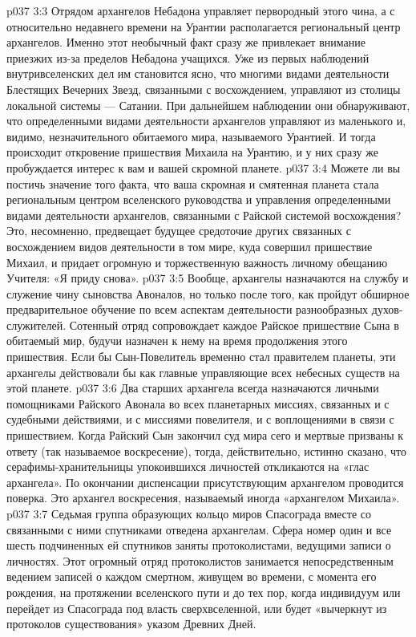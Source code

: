 \vs p037 3:3 \pc Отрядом архангелов Небадона управляет первородный этого чина, а с относительно недавнего времени на Урантии располагается региональный центр архангелов. Именно этот необычный факт сразу же привлекает внимание приезжих из\hyp{}за пределов Небадона учащихся. Уже из первых наблюдений внутривселенских дел им становится ясно, что многими видами деятельности Блестящих Вечерних Звезд, связанными с восхождением, управляют из столицы локальной системы --- Сатании. При дальнейшем наблюдении они обнаруживают, что определенными видами деятельности архангелов управляют из маленького и, видимо, незначительного обитаемого мира, называемого Урантией. И тогда происходит откровение пришествия Михаила на Урантию, и у них сразу же пробуждается интерес к вам и вашей скромной планете.
\vs p037 3:4 Можете ли вы постичь значение того факта, что ваша скромная и смятенная планета стала региональным центром вселенского руководства и управления определенными видами деятельности архангелов, связанными с Райской системой восхождения? Это, несомненно, предвещает будущее средоточие других связанных с восхождением видов деятельности в том мире, куда совершил пришествие Михаил, и придает огромную и торжественную важность личному обещанию Учителя: «Я приду снова».
\vs p037 3:5 \pc Вообще, архангелы назначаются на службу и служение чину сыновства Авоналов, но только после того, как пройдут обширное предварительное обучение по всем аспектам деятельности разнообразных духов\hyp{}служителей. Сотенный отряд сопровождает каждое Райское пришествие Сына в обитаемый мир, будучи назначен к нему на время продолжения этого пришествия. Если бы Сын\hyp{}Повелитель временно стал правителем планеты, эти архангелы действовали бы как главные управляющие всех небесных существ на этой планете.
\vs p037 3:6 Два старших архангела всегда назначаются личными помощниками Райского Авонала во всех планетарных миссиях, связанных и с судебными действиями, и с миссиями повелителя, и с воплощениями в связи с пришествием. Когда Райский Сын закончил суд мира сего и мертвые призваны к ответу (так называемое воскресение), тогда, действительно, истинно сказано, что серафимы\hyp{}хранительницы упокоившихся личностей откликаются на «глас архангела». По окончании диспенсации присутствующим архангелом проводится поверка. Это архангел воскресения, называемый иногда «архангелом Михаила».
\vs p037 3:7 \pc {} Седьмая группа образующих кольцо миров Спасограда вместе со связанными с ними спутниками отведена архангелам. Сфера номер один и все шесть подчиненных ей спутников заняты протоколистами, ведущими записи о личностях. Этот огромный отряд протоколистов занимается непосредственным ведением записей о каждом смертном, живущем во времени, с момента его рождения, на протяжении вселенского пути и до тех пор, когда индивидуум или перейдет из Спасограда под власть сверхвселенной, или будет «вычеркнут из протоколов существования» указом Древних Дней.
